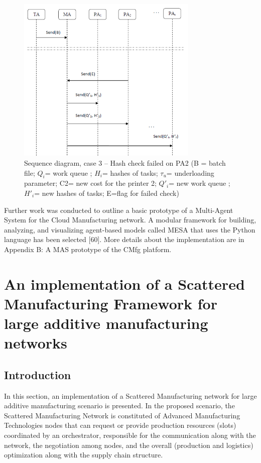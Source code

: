 \begin{figure}[h]
    \centering
    \includegraphics[height=8cm, keepaspectratio]{images/sequence-diagram-case3}
    \caption{Sequence diagram, case 3 – Hash check failed on PA2 (B = batch file; $Q_i$= work queue ; $H_i$= hashes of tasks; $\tau_u$= underloading parameter; C2= new cost for the printer 2; $Q\prime_i$= new work queue ; $H\prime_i$= new hashes of tasks; E=flag for failed check)}
    \label{fig:seq-diag-case3}
\end{figure}

Further work was conducted to outline a basic prototype of a Multi-Agent System for the Cloud Manufacturing network. A modular framework for building, analyzing, and visualizing agent-based models called MESA that uses the Python language has been selected [60]. More details about the implementation are in Appendix B: A MAS prototype of the CMfg platform.

\section{An implementation of a Scattered Manufacturing Framework for large additive manufacturing networks}
\subsection{Introduction}
In this section, an implementation of a Scattered Manufacturing network for large additive manufacturing scenario is presented. In the proposed scenario, the Scattered Manufacturing Network is constituted of Advanced Manufacturing Technologies nodes that can request or provide production resources (slots) coordinated by an orchestrator, responsible for the communication along with the network, the negotiation among nodes, and the overall (production and logistics) optimization along with the supply chain structure.\\

